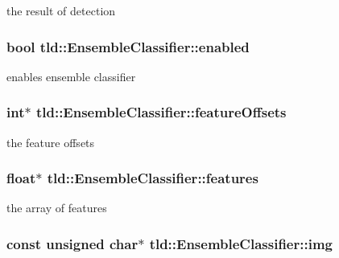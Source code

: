 the result of detection 

\hypertarget{classtld_1_1EnsembleClassifier_a539d429a773ec9b2b86946fddb39ac52}{
\subsubsection[{enabled}]{\setlength{\rightskip}{0pt plus 5cm}bool tld\-::\-Ensemble\-Classifier\-::enabled}}\label{classtld_1_1EnsembleClassifier_a539d429a773ec9b2b86946fddb39ac52}


enables ensemble classifier 

\hypertarget{classtld_1_1EnsembleClassifier_acf42e105ca1cb616aaf2d8e4d8755c41}{
\subsubsection[{feature\-Offsets}]{\setlength{\rightskip}{0pt plus 5cm}int$\ast$ tld\-::\-Ensemble\-Classifier\-::feature\-Offsets}}\label{classtld_1_1EnsembleClassifier_acf42e105ca1cb616aaf2d8e4d8755c41}


the feature offsets 

\hypertarget{classtld_1_1EnsembleClassifier_a02deffee640b4106051024d1ae8a55aa}{
\subsubsection[{features}]{\setlength{\rightskip}{0pt plus 5cm}float$\ast$ tld\-::\-Ensemble\-Classifier\-::features}}\label{classtld_1_1EnsembleClassifier_a02deffee640b4106051024d1ae8a55aa}


the array of features 

\hypertarget{classtld_1_1EnsembleClassifier_a0894da7012fdd72a562dbf78f719bfe9}{
\subsubsection[{img}]{\setlength{\rightskip}{0pt plus 5cm}const unsigned char$\ast$ tld\-::\-Ensemble\-Classifier\-::img\hspace{0.3cm}{\ttfamily [private]}}}\label{classtld_1_1EnsembleClassifier_a0894da7012fdd72a562dbf78f719bfe9}


